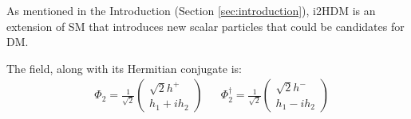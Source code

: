 \documentclass[12pt]{article}
\begin{document}
As mentioned in the Introduction (Section \ref{sec:introduction}), i2HDM is an extension of SM that introduces new scalar particles that could be candidates for DM.

The field, along with its Hermitian conjugate is:
\begin{align}
    &\Phi_2 = \frac{1}{\sqrt{2}}
        \begin{pmatrix}
            {\sqrt{2}h^+} \\
            {h_1 + ih_2 }
        \end{pmatrix}&
    &\Phi_2^\dagger = \frac{1}{\sqrt{2}} 
        \begin{pmatrix}
            {\sqrt{2}h^-} \\
            {h_1 - ih_2 }
        \end{pmatrix}
\end{align} 
\end{document}

